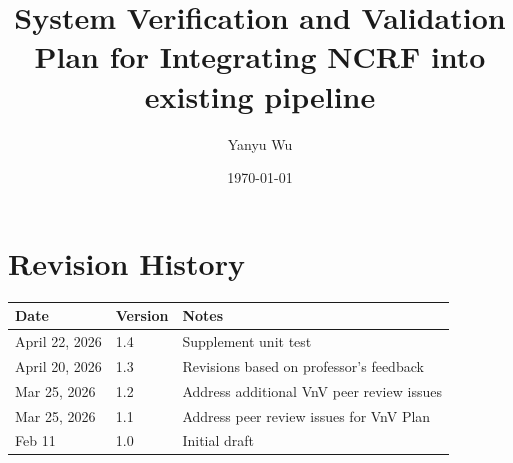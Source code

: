 \documentclass[12pt, titlepage]{article}
\renewcommand{\progname}{Integrating NCRF into existing pipeline}
\begin{document}
\title{System Verification and Validation Plan for \progname{}} 
\author{Yanyu Wu}
\date{\today}
	
\maketitle


\section*{Revision History}

\begin{tabularx}{\textwidth}{p{3cm}p{2cm}X}
\toprule {\bf Date} & {\bf Version} & {\bf Notes}\\
\midrule
April 22, 2026 & 1.4 & Supplement unit test\\
April 20, 2026 & 1.3 & Revisions based on professor's feedback\\
Mar 25, 2026 & 1.2 & Address additional VnV peer review issues\\
Mar 25, 2026 & 1.1 & Address peer review issues for VnV Plan\\
Feb 11 & 1.0 & Initial draft\\
\bottomrule
\end{tabularx}



\newpage

\tableofcontents

\listoftables
\end{document}
